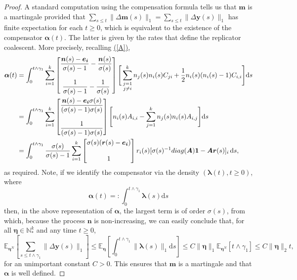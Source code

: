 \documentclass[12pt, leqno]{article}
\renewcommand{\eqref}[1]{\hyperref[#1]{(\ref*{#1})}}
\newcommand*{\norm}[1]{\lVert #1 \rVert}
\newcommand{\dd}{{\mathrm d}}
\begin{document}
\begin{proof}
A standard computation using the compensation formula tells us that 
$\bm m$ is a martingale provided that $\sum_{s\leq t}\norm{\Delta \bm m(s)}_1=\sum_{s\leq t}\norm{\Delta \bm y(s)}_1$ has finite expectation for each $t\geq 0$, which is equivalent to the existence of the compensator $\bm \alpha(t)$. The latter is given by the rates that define the replicator coalescent. More precisely, recalling \eqref{A}, 
\begin{align}
\bm\alpha(t)
&=\int_{0}^{t\wedge \gamma_1}\sum_{i=1}^k \begin{bmatrix}\dfrac{\bm n(s)-\bm{e_i}}{\sigma(s)-1}-\dfrac{\bm n(s)}{\sigma(s)}\\ \\ \dfrac{1}{\sigma(s)-1}-\dfrac{1}{\sigma(s)}\end{bmatrix}\Bigg[ \sum_{\substack{j=1 \\ j\neq i}}^kn_j(s)n_i(s)C_{ji}+\frac{1}{2}n_i(s)(n_i(s)-1)C_{i,i}\Bigg] \dd s\notag\\
&=\int_{0}^{t\wedge \gamma_1}\sum_{i=1}^k\begin{bmatrix}\dfrac{\bm n(s)-\bm{e_i}\sigma(s)}{(\sigma(s)-1)\sigma(s)}\\\\ \dfrac{1}{(\sigma(s)-1)\sigma(s)}\end{bmatrix}\Bigg[ n_i(s)A_{i,i}-\sum_{j=1 }^kn_j(s)n_i(s)A_{i,j} \Bigg] \dd s\notag\\
&=\int_{0}^{t\wedge \gamma_1} \dfrac{\sigma(s)}{\sigma(s)-1}\sum_{i = 1}^k \begin{bmatrix} \sigma(s)(\bm r (s)-\bm{e_i}) \\ \\1\end{bmatrix}r_i(s) [\sigma(s)^{-1} {\rm diag}(\bm A)\bm{1}-\bm A\bm r(s) ]_i \,\dd s,
\label{deriveda}
\end{align}
as required. Note, if we identify the compensator via the density $(\bm\lambda(t), t\geq0)$, where  
\begin{equation}
\bm\alpha(t) = :\int_0^{t\wedge \gamma_1} \bm\lambda(s)\dd s
\label{lambda}
\end{equation}
 then, in the  above representation of $\bm\alpha$, the largest term is of order $\sigma(s)$, from which, because the process $\bm n$ is non-increasing, we can  easily conclude that,  for all $\bm\eta\in\mathbb{N}^k_*$ and any  time $t\geq 0$, 
\begin{equation}
\mathbb{E}_{\bm \eta^N}\left[ \sum_{s\leq t \wedge \gamma_1}\norm{\Delta\bm y(s)}_1\right]\leq 
 \mathbb{E}_{\bm \eta}\left[\int_0^{t\wedge \gamma_1} \norm{\bm\lambda (s)}_1 \dd s\right]\leq C\norm{\bm\eta}_1\mathbb{E}_{\bm \eta^N}[t\wedge \gamma_1]\leq C\norm{\bm\eta}_2t,
\label{mgcontrol}
\end{equation}
for an unimportant constant $C>0$. This
 ensures that  $\bm m$ is a martingale and that $\bm\alpha$ is well defined. 
\end{proof}
\end{document}
